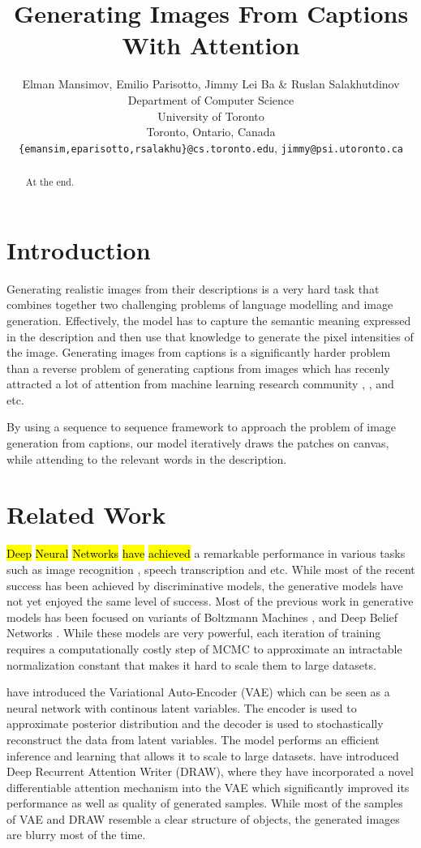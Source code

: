 \documentclass{article} %
\title{Generating Images From Captions\\ With Attention}
\author{
Elman Mansimov, Emilio Parisotto, Jimmy Lei Ba \& Ruslan Salakhutdinov\\
Department of Computer Science\\
University of Toronto\\
Toronto, Ontario, Canada \\
\texttt{\{emansim,eparisotto,rsalakhu\}@cs.toronto.edu}, \texttt{jimmy@psi.utoronto.ca}
}
\newcommand{\hlc}[2][yellow]{{\sethlcolor{#1}\hl{#2}}}
\begin{document}
\maketitle

\begin{abstract}
At the end.
\end{abstract}

\section{Introduction}

Generating realistic images from their descriptions is a very hard task that combines together two challenging problems of language modelling and image generation. Effectively, the model has to capture the semantic meaning expressed in the description and then use that knowledge to generate the pixel intensities of the image. Generating images from captions is a significantly harder problem than a reverse problem of generating captions from images which has recenly attracted a lot of attention from machine learning research community \citep{karpathy_captions}, \citep{xu_captions}, \citep{kiros_captions} and etc. 

By using a sequence to sequence framework to approach the problem of image generation from captions, our model iteratively draws the patches on canvas, while attending to the relevant words in the description.


\section{Related Work}

\hlc[1]{Deep} \hlc[2]{Neural} \hlc[3]{Networks} \hlc[4]{have} \hlc[0]{achieved} a remarkable performance in various tasks such as image recognition \citep{krizhevsky_imagenet}, speech transcription \citep{graves_speech} and etc. While most of the recent success has been achieved by discriminative models, the generative models have not yet enjoyed the same level of success. Most of the previous work in generative models has been focused on variants of Boltzmann Machines \citep{smolensky_rbm}, \citep{russ_dbm} and Deep Belief Networks \citep{hinton_dbn}. While these models are very powerful, each iteration of training requires a computationally costly step of MCMC to approximate an intractable normalization constant that makes it hard to scale them to large datasets.

\cite{kingma_vae} have introduced the Variational Auto-Encoder (VAE) which can be seen as a neural network with continous latent variables. The encoder is used to approximate posterior distribution and the decoder is used to stochastically reconstruct the data from latent variables. The model performs an efficient inference and learning that allows it to scale to large datasets. \cite{gregor_draw} have introduced Deep Recurrent Attention Writer (DRAW), where they have incorporated a novel differentiable attention mechanism into the VAE which significantly improved its performance as well as quality of generated samples. While most of the samples of VAE and DRAW resemble a clear structure of objects, the generated images are blurry most of the time.
\end{document}
